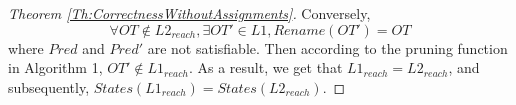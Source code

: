 \documentclass[smallcondensed]{svjour3}
\newcommand{\ERIC}[1]{\textcolor{blue}{#1}}
\begin{document}
\begin{proof}[Theorem \ref{Th:CorrectnessWithoutAssignments}]
Conversely,
\[\forall OT\notin L2_{reach}, \exists OT'\in L1, Rename(OT') = OT\]
where $Pred$ and $Pred'$ are not satisfiable. Then according to the pruning function in Algorithm 1, $OT'\notin L1_{reach}$. 
As a result, we get that $L1_{reach}=L2_{reach}$, and subsequently, $States(L1_{reach})=States(L2_{reach})$.
%	
%	
%	
%		

\end{proof}
\end{document}
